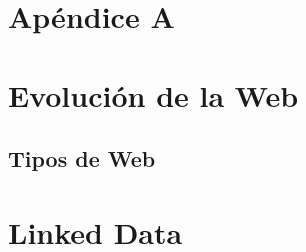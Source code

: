 





\newpage

\section*{\huge Apéndice A} 
\section*{Evolución de la Web}
\label{ch:ApendiceA}

\subsection{Tipos de Web} %

\section{Linked Data}






